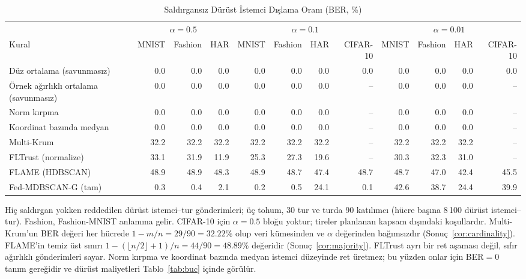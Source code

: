\begin{table}[!tp]
\centering\footnotesize
\setlength{\tabcolsep}{4pt}
\caption{Saldırgansız Dürüst İstemci Dışlama Oranı (BER, \%)}\label{tab:ber}
\begin{adjustbox}{max width=\textwidth}
\begin{tabular}{lrrrrrrrrrrr}
\toprule
& \multicolumn{3}{c}{$\alpha=0.5$} & \multicolumn{4}{c}{$\alpha=0.1$} & \multicolumn{4}{c}{$\alpha=0.01$} \\
\cmidrule(lr){2-4}\cmidrule(lr){5-8}\cmidrule(lr){9-12}
Kural & MNIST & Fashion & HAR & MNIST & Fashion & HAR & CIFAR-10 & MNIST & Fashion & HAR & CIFAR-10 \\
\midrule
Düz ortalama (savunmasız) & 0.0 & 0.0 & 0.0 & 0.0 & 0.0 & 0.0 & 0.0 & 0.0 & 0.0 & 0.0 & 0.0 \\
Örnek ağırlıklı ortalama (savunmasız) & 0.0 & 0.0 & 0.0 & 0.0 & 0.0 & 0.0 & -- & 0.0 & 0.0 & 0.0 & -- \\
Norm kırpma & 0.0 & 0.0 & 0.0 & 0.0 & 0.0 & 0.0 & -- & 0.0 & 0.0 & 0.0 & -- \\
Koordinat bazında medyan & 0.0 & 0.0 & 0.0 & 0.0 & 0.0 & 0.0 & -- & 0.0 & 0.0 & 0.0 & -- \\
Multi-Krum & 32.2 & 32.2 & 32.2 & 32.2 & 32.2 & 32.2 & -- & 32.2 & 32.2 & 32.2 & -- \\
FLTrust (normalize) & 33.1 & 31.9 & 11.9 & 25.3 & 27.3 & 19.6 & -- & 30.3 & 32.3 & 31.0 & -- \\
FLAME (HDBSCAN) & 48.9 & 48.9 & 48.3 & 48.9 & 48.7 & 47.4 & 48.7 & 48.7 & 47.0 & 42.4 & 45.5 \\
Fed-MDBSCAN-G (tam) & 0.3 & 0.4 & 2.1 & 0.2 & 0.5 & 24.1 & 0.1 & 42.6 & 38.7 & 24.4 & 39.9 \\
\bottomrule
\end{tabular}
\end{adjustbox}

\par\vspace{3pt}\parbox{\linewidth}{\footnotesize Hiç saldırgan yokken reddedilen dürüst istemci--tur gönderimleri; üç tohum, 30 tur ve turda 90 katılımcı (hücre başına 8\,100 dürüst istemci--tur). Fashion, Fashion-MNIST anlamına gelir. CIFAR-10 için $\alpha=0.5$ bloğu yoktur; tireler planlanan kapsam dışındaki koşullardır. Multi-Krum'un BER değeri her hücrede $1-m/n=29/90=32.22\%$ olup veri kümesinden ve $\alpha$ değerinden bağımsızdır (Sonuç~\ref{cor:cardinality}). FLAME'in temiz üst sınırı $1-(\lfloor n/2\rfloor+1)/n=44/90=48.89\%$ değeridir (Sonuç~\ref{cor:majority}). FLTrust ayrı bir ret aşaması değil, sıfır ağırlıklı gönderimleri sayar. Norm kırpma ve koordinat bazında medyan istemci düzeyinde ret üretmez; bu yüzden onlar için BER${}=0$ tanım gereğidir ve dürüst maliyetleri Tablo~\ref{tab:buc} içinde görülür.}
\end{table}
